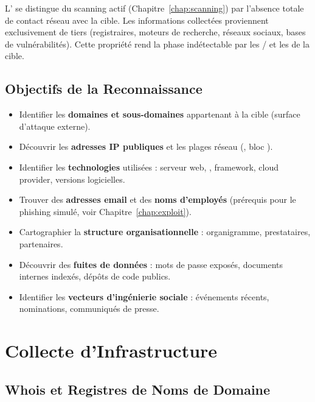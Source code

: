 L' se distingue du scanning actif (Chapitre~\ref{chap:scanning})
par l'absence totale de contact réseau avec la cible. Les informations collectées
proviennent exclusivement de tiers (registraires, moteurs de recherche, réseaux
sociaux, bases de vulnérabilités). Cette propriété rend la phase indétectable par
les / et les  de la cible.

\subsection{Objectifs de la Reconnaissance}

\begin{itemize}
    \item Identifier les \textbf{domaines et sous-domaines} appartenant à la cible
          (surface d'attaque externe).
    \item Découvrir les \textbf{adresses IP publiques} et les plages réseau
          (, bloc ).
    \item Identifier les \textbf{technologies} utilisées : serveur web, ,
          framework, cloud provider, versions logicielles.
    \item Trouver des \textbf{adresses email} et des \textbf{noms d'employés}
          (prérequis pour le phishing simulé, voir
          Chapitre~\ref{chap:exploit}).
    \item Cartographier la \textbf{structure organisationnelle} : organigramme,
          prestataires, partenaires.
    \item Découvrir des \textbf{fuites de données} : mots de passe exposés,
          documents internes indexés, dépôts de code publics.
    \item Identifier les \textbf{vecteurs d'ingénierie sociale} : événements
          récents, nominations, communiqués de presse.
\end{itemize}

\section{Collecte d'Infrastructure}
\label{sec:infra_collect}

\subsection{Whois et Registres de Noms de Domaine}
\label{subsec:whois}

